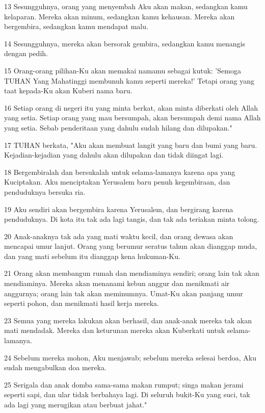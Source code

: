 \par 13 Sesungguhnya, orang yang menyembah Aku akan makan, sedangkan kamu kelaparan. Mereka akan minum, sedangkan kamu kehausan. Mereka akan bergembira, sedangkan kamu mendapat malu.
\par 14 Sesungguhnya, mereka akan bersorak gembira, sedangkan kamu menangis dengan pedih.
\par 15 Orang-orang pilihan-Ku akan memakai namamu sebagai kutuk: 'Semoga TUHAN Yang Mahatinggi membunuh kamu seperti mereka!' Tetapi orang yang taat kepada-Ku akan Kuberi nama baru.
\par 16 Setiap orang di negeri itu yang minta berkat, akan minta diberkati oleh Allah yang setia. Setiap orang yang mau bersumpah, akan bersumpah demi nama Allah yang setia. Sebab penderitaan yang dahulu sudah hilang dan dilupakan."
\par 17 TUHAN berkata, "Aku akan membuat langit yang baru dan bumi yang baru. Kejadian-kejadian yang dahulu akan dilupakan dan tidak diingat lagi.
\par 18 Bergembiralah dan bersukalah untuk selama-lamanya karena apa yang Kuciptakan. Aku menciptakan Yerusalem baru penuh kegembiraan, dan penduduknya bersuka ria.
\par 19 Aku sendiri akan bergembira karena Yerusalem, dan bergirang karena penduduknya. Di kota itu tak ada lagi tangis, dan tak ada teriakan minta tolong.
\par 20 Anak-anaknya tak ada yang mati waktu kecil, dan orang dewasa akan mencapai umur lanjut. Orang yang berumur seratus tahun akan dianggap muda, dan yang mati sebelum itu dianggap kena hukuman-Ku.
\par 21 Orang akan membangun rumah dan mendiaminya sendiri; orang lain tak akan mendiaminya. Mereka akan menanami kebun anggur dan menikmati air anggurnya; orang lain tak akan meminumnya. Umat-Ku akan panjang umur seperti pohon, dan menikmati hasil kerja mereka.
\par 23 Semua yang mereka lakukan akan berhasil, dan anak-anak mereka tak akan mati mendadak. Mereka dan keturunan mereka akan Kuberkati untuk selama-lamanya.
\par 24 Sebelum mereka mohon, Aku menjawab; sebelum mereka selesai berdoa, Aku sudah mengabulkan doa mereka.
\par 25 Serigala dan anak domba sama-sama makan rumput; singa makan jerami seperti sapi, dan ular tidak berbahaya lagi. Di seluruh bukit-Ku yang suci, tak ada lagi yang merugikan atau berbuat jahat."

